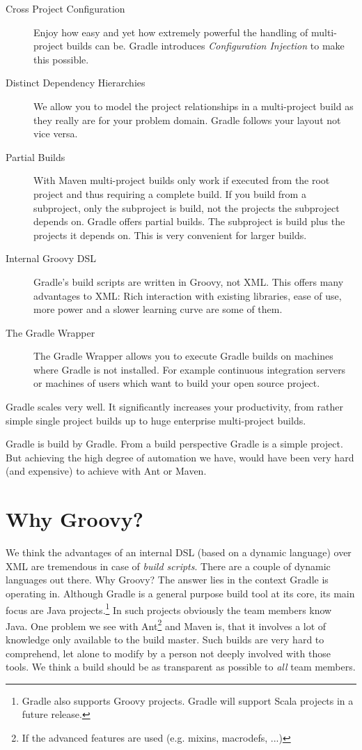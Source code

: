 \begin{description}
	\item[Cross Project Configuration] Enjoy how easy and yet how extremely powerful the handling of multi-project builds can be. Gradle introduces \emph{Configuration Injection} to make this possible. 
	\item[Distinct Dependency Hierarchies] We allow you to model the project relationships in a multi-project build as they really are for your problem domain. Gradle follows your layout not vice versa.
	\item[Partial Builds] With Maven multi-project builds only work if executed from the root project and thus requiring a complete build. If you build from a subproject, only the subproject is build, not the projects the subproject depends on. Gradle offers partial builds. The subproject is build plus the projects it depends on. This is very convenient for larger builds.    	
	\item[Internal Groovy DSL] Gradle's build scripts are written in Groovy, not XML. This offers many  advantages to XML: Rich interaction with existing libraries, ease of use, more power and a slower learning curve are some of them.
    \item[The Gradle Wrapper] The Gradle Wrapper allows you to execute Gradle builds on machines where Gradle is not installed. For example continuous integration servers or machines of users which want to build your open source project.          
\end{description}
Gradle scales very well. It significantly increases your productivity, from rather simple single project builds up to huge enterprise multi-project builds. 

Gradle is build by Gradle. From a build perspective Gradle is a simple project. But achieving the high degree of automation we have, would have been very hard (and expensive) to achieve with Ant or Maven.

\section{Why Groovy?} %
\label{sec:why_groovy}
We think the advantages of an internal DSL (based on a dynamic language) over XML are tremendous in case of \emph{build scripts}. There are a couple of dynamic languages out there. Why Groovy? The answer lies in the context Gradle is operating in. Although Gradle is a general purpose build tool at its core, its main focus are Java projects.\footnote{Gradle also supports Groovy projects. Gradle will support Scala projects in a future release.} In such projects obviously the team members know Java. One problem we see with Ant\footnote{If the advanced features are used (e.g. mixins, macrodefs, ...)} and Maven is, that it involves a lot of knowledge only available to the build master. Such builds are very hard to comprehend, let alone to modify by a person not deeply involved with those tools. We think a build should be as transparent as possible to \emph{all} team members. 

